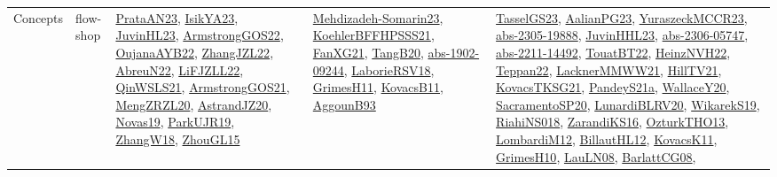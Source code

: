 {\begin{longtable}{lp{3cm}>{\raggedright}p{6cm}>{\raggedright}p{6cm}p{8cm}}
Concepts & flow-shop & \href{articles/PrataAN23.pdf}{PrataAN23}\cite{PrataAN23}, \href{articles/IsikYA23.pdf}{IsikYA23}\cite{IsikYA23}, \href{papers/JuvinHL23.pdf}{JuvinHL23}\cite{JuvinHL23}, \href{papers/ArmstrongGOS22.pdf}{ArmstrongGOS22}\cite{ArmstrongGOS22}, \href{papers/OujanaAYB22.pdf}{OujanaAYB22}\cite{OujanaAYB22}, \href{papers/ZhangJZL22.pdf}{ZhangJZL22}\cite{ZhangJZL22}, \href{articles/AbreuN22.pdf}{AbreuN22}\cite{AbreuN22}, \href{papers/LiFJZLL22.pdf}{LiFJZLL22}\cite{LiFJZLL22}, \href{articles/QinWSLS21.pdf}{QinWSLS21}\cite{QinWSLS21}, \href{papers/ArmstrongGOS21.pdf}{ArmstrongGOS21}\cite{ArmstrongGOS21}, \href{articles/MengZRZL20.pdf}{MengZRZL20}\cite{MengZRZL20}, \href{articles/AstrandJZ20.pdf}{AstrandJZ20}\cite{AstrandJZ20}, \href{articles/Novas19.pdf}{Novas19}\cite{Novas19}, \href{papers/ParkUJR19.pdf}{ParkUJR19}\cite{ParkUJR19}, \href{articles/ZhangW18.pdf}{ZhangW18}\cite{ZhangW18}, \href{papers/ZhouGL15.pdf}{ZhouGL15}\cite{ZhouGL15} & \href{papers/Mehdizadeh-Somarin23.pdf}{Mehdizadeh-Somarin23}\cite{Mehdizadeh-Somarin23}, \href{articles/KoehlerBFFHPSSS21.pdf}{KoehlerBFFHPSSS21}\cite{KoehlerBFFHPSSS21}, \href{articles/FanXG21.pdf}{FanXG21}\cite{FanXG21}, \href{papers/TangB20.pdf}{TangB20}\cite{TangB20}, \href{articles/abs-1902-09244.pdf}{abs-1902-09244}\cite{abs-1902-09244}, \href{articles/LaborieRSV18.pdf}{LaborieRSV18}\cite{LaborieRSV18}, \href{papers/GrimesH11.pdf}{GrimesH11}\cite{GrimesH11}, \href{articles/KovacsB11.pdf}{KovacsB11}\cite{KovacsB11}, \href{articles/AggounB93.pdf}{AggounB93}\cite{AggounB93} & \href{papers/TasselGS23.pdf}{TasselGS23}\cite{TasselGS23}, \href{papers/AalianPG23.pdf}{AalianPG23}\cite{AalianPG23}, \href{articles/YuraszeckMCCR23.pdf}{YuraszeckMCCR23}\cite{YuraszeckMCCR23}, \href{articles/abs-2305-19888.pdf}{abs-2305-19888}\cite{abs-2305-19888}, \href{papers/JuvinHHL23.pdf}{JuvinHHL23}\cite{JuvinHHL23}, \href{articles/abs-2306-05747.pdf}{abs-2306-05747}\cite{abs-2306-05747}, \href{articles/abs-2211-14492.pdf}{abs-2211-14492}\cite{abs-2211-14492}, \href{papers/TouatBT22.pdf}{TouatBT22}\cite{TouatBT22}, \href{articles/HeinzNVH22.pdf}{HeinzNVH22}\cite{HeinzNVH22}, \href{papers/Teppan22.pdf}{Teppan22}\cite{Teppan22}, \href{papers/LacknerMMWW21.pdf}{LacknerMMWW21}\cite{LacknerMMWW21}, \href{papers/HillTV21.pdf}{HillTV21}\cite{HillTV21}, \href{papers/KovacsTKSG21.pdf}{KovacsTKSG21}\cite{KovacsTKSG21}, \href{articles/PandeyS21a.pdf}{PandeyS21a}\cite{PandeyS21a}, \href{articles/WallaceY20.pdf}{WallaceY20}\cite{WallaceY20}, \href{articles/SacramentoSP20.pdf}{SacramentoSP20}\cite{SacramentoSP20}, \href{articles/LunardiBLRV20.pdf}{LunardiBLRV20}\cite{LunardiBLRV20}, \href{articles/WikarekS19.pdf}{WikarekS19}\cite{WikarekS19}, \href{papers/RiahiNS018.pdf}{RiahiNS018}\cite{RiahiNS018}, \href{articles/ZarandiKS16.pdf}{ZarandiKS16}\cite{ZarandiKS16}, \href{articles/OzturkTHO13.pdf}{OzturkTHO13}\cite{OzturkTHO13}, \href{articles/LombardiM12.pdf}{LombardiM12}\cite{LombardiM12}, \href{papers/BillautHL12.pdf}{BillautHL12}\cite{BillautHL12}, \href{articles/KovacsK11.pdf}{KovacsK11}\cite{KovacsK11}, \href{papers/GrimesH10.pdf}{GrimesH10}\cite{GrimesH10}, \href{papers/LauLN08.pdf}{LauLN08}\cite{LauLN08}, \href{papers/BarlattCG08.pdf}{BarlattCG08}\cite{BarlattCG08}, 
\end{longtable}}

